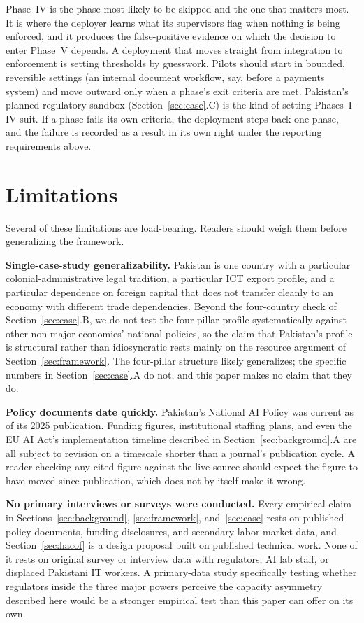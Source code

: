 \documentclass{ieeeaccess}
\begin{document}
Phase~IV is the phase most likely to be skipped and the one that matters most. It is where the deployer learns what its supervisors flag when nothing is being enforced, and it produces the false-positive evidence on which the decision to enter Phase~V depends. A deployment that moves straight from integration to enforcement is setting thresholds by guesswork. Pilots should start in bounded, reversible settings (an internal document workflow, say, before a payments system) and move outward only when a phase's exit criteria are met. Pakistan's planned regulatory sandbox (Section~\ref{sec:case}.C) is the kind of setting Phases~I--IV suit. If a phase fails its own criteria, the deployment steps back one phase, and the failure is recorded as a result in its own right under the reporting requirements above.

\section{Limitations}
\label{sec:limits}

Several of these limitations are load-bearing. Readers should weigh them before generalizing the framework.

\textbf{Single-case-study generalizability.} Pakistan is one country with a particular colonial-administrative legal tradition, a particular ICT export profile, and a particular dependence on foreign capital that does not transfer cleanly to an economy with different trade dependencies. Beyond the four-country check of Section~\ref{sec:case}.B, we do not test the four-pillar profile systematically against other non-major economies' national policies, so the claim that Pakistan's profile is structural rather than idiosyncratic rests mainly on the resource argument of Section~\ref{sec:framework}. The four-pillar structure likely generalizes; the specific numbers in Section~\ref{sec:case}.A do not, and this paper makes no claim that they do.

\textbf{Policy documents date quickly.} Pakistan's National AI Policy was current as of its 2025 publication. Funding figures, institutional staffing plans, and even the EU AI Act's implementation timeline described in Section~\ref{sec:background}.A are all subject to revision on a timescale shorter than a journal's publication cycle. A reader checking any cited figure against the live source should expect the figure to have moved since publication, which does not by itself make it wrong.

\textbf{No primary interviews or surveys were conducted.} Every empirical claim in Sections~\ref{sec:background}, \ref{sec:framework}, and~\ref{sec:case} rests on published policy documents, funding disclosures, and secondary labor-market data, and Section~\ref{sec:hacof} is a design proposal built on published technical work. None of it rests on original survey or interview data with regulators, AI lab staff, or displaced Pakistani IT workers. A primary-data study specifically testing whether regulators inside the three major powers perceive the capacity asymmetry described here would be a stronger empirical test than this paper can offer on its own.
\end{document}
